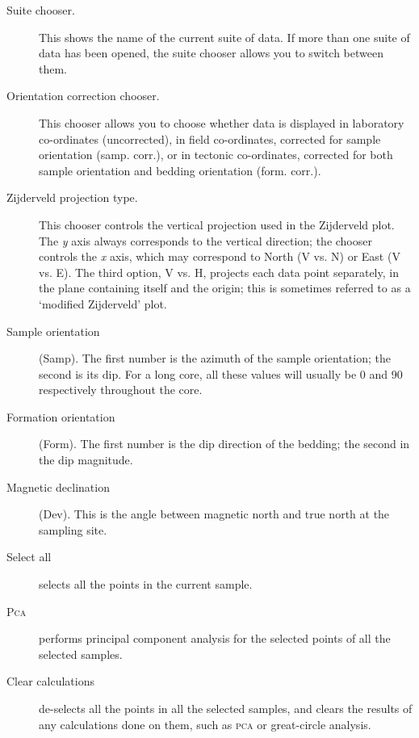 \documentclass[a4paper]{article}
\newcommand{\ppcmd}[1]{\textsf{#1}} %
\newcommand{\caps}[1]{\textsc{#1}} %
\begin{document}
\begin{description}

\item[Suite chooser.] This shows the name of the current suite of
data. If more than one suite of data has been opened, the suite chooser
allows you to switch between them.

\item[Orientation correction chooser.] This chooser allows you to
choose whether data is displayed in laboratory co-ordinates
(\ppcmd{uncorrected}), in field co-ordinates, corrected for sample orientation
(\ppcmd{samp. corr.}), or in tectonic co-ordinates, corrected for both
sample orientation and bedding orientation (\ppcmd{form. corr.}).

\item[Zijderveld projection type.] This chooser controls the vertical
projection used in the Zijderveld plot. The {\em y} axis always corresponds
to the vertical direction; the chooser controls the {\em x} axis, which may
correspond to North (\ppcmd{V vs. N}) or East (\ppcmd{V vs. E}). The third
option, \ppcmd{V vs. H}, projects each data point separately, in the plane
containing itself and the origin; this is sometimes referred to as a
`modified Zijderveld' plot.

\item[Sample orientation] (\ppcmd{Samp}). The first number is the
azimuth of the sample orientation; the second is its dip. For a long core,
all these values will usually be 0 and 90 respectively throughout the core.

\item[Formation orientation] (\ppcmd{Form}). The first number is the
dip direction of the bedding; the second in the dip magnitude.

\item[Magnetic declination] (\ppcmd{Dev}). This is the angle between
magnetic north and true north at the sampling site.

\item[Select all] selects all the points in the current sample.

\item[\caps{Pca}] performs principal component analysis for the
selected points of all the selected samples.

\item[Clear calculations] de-selects all the points in all the
selected samples, and clears the results of any calculations done on them,
such as \caps{pca} or great-circle analysis.

\end{description}
\end{document}
